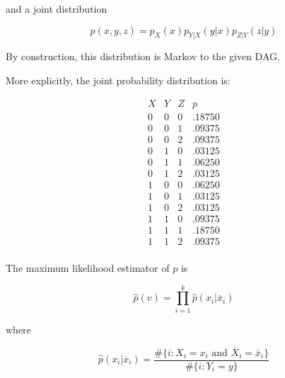 and a joint distribution

\[ p(x, y, z) = p_X(x) p_{Y | X}(y | x) p_{Z | Y}(z | y) \]

By construction, this distribution is Markov to the given DAG.

More explicitly, the joint probability distribution is:

\[
\begin{array}{ccc|c}
X & Y & Z & p \\
\hline
0 & 0 & 0 & .18750 \\
0 & 0 & 1 & .09375 \\
0 & 0 & 2 & .09375 \\
0 & 1 & 0 & .03125 \\
0 & 1 & 1 & .06250 \\
0 & 1 & 2 & .03125 \\
1 & 0 & 0 & .06250 \\
1 & 0 & 1 & .03125 \\
1 & 0 & 2 & .03125 \\
1 & 1 & 0 & .09375 \\
1 & 1 & 1 & .18750 \\
1 & 1 & 2 & .09375 \\
\end{array}
\]

The maximum likelihood estimator of \(p\) is

\[ \hat{p}(v) = \prod_{i=1}^{k} \hat{p}(x_{i} | \overline{x}_{i}) \]

where

\[ \hat{p}(x_{i} | \overline{x}_{i}) = \frac{\# \{i : X_{i} = x_{i} \text{ and } \overline{X}_{i} = \overline{x}_{i} \}}{\# \{i : Y_{i} = y \}} \]

